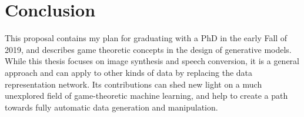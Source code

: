 \documentclass{article}
\begin{document}



\section{Conclusion}
\label{Sec:Con}

This proposal contains my plan for graduating with a PhD in the early Fall of 2019, and describes game theoretic concepts in the design of generative models. While this thesis focuses on image synthesis and speech conversion, it is a general approach and can apply to other kinds of data by replacing the data representation network. Its contributions can shed new light on a much unexplored field of game-theoretic machine learning, and help to create a path towards fully automatic data generation and manipulation.


\end{document}
